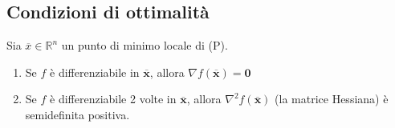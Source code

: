 \subsection{Condizioni di ottimalit\`a}
\begin{theo} Sia
$\overline{x} \in \mathbb{R}^{n}$ un punto di minimo locale di (P).
\begin{enumerate}
 \item Se $f$ \`e differenziabile in $\mathbf{\overline{x}}$, allora
$\nabla f(\mathbf{\overline{x}}) = \mathbf{0}$
 \item Se $f$ \`e differenziabile 2 volte in $\mathbf{\overline{x}}$,
allora $\nabla^{2}f(\mathbf{\overline{x}})$ (la matrice Hessiana) \`e
semidefinita positiva.
\end{enumerate}
\end{theo}

